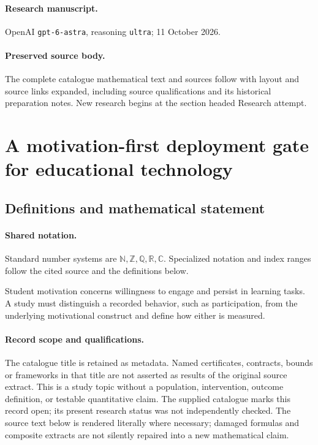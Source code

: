 \documentclass[11pt]{article}
\begin{document}
\paragraph{Research manuscript.} OpenAI \texttt{gpt-6-astra}, reasoning \texttt{ultra}; 11 October 2026.
\paragraph{Preserved source body.} The complete catalogue mathematical text and sources follow with layout and source links expanded, including source qualifications and its historical preparation notes. New research begins at the section headed Research attempt.

\section{A motivation-first deployment gate for educational technology}\label{statement}

\subsection{Definitions and mathematical statement}

\paragraph{Shared notation.}Standard number systems are $\mathbb N,\mathbb Z,\mathbb Q,\mathbb R,\mathbb C$. Specialized notation and index ranges follow the cited source and the definitions below.


Student motivation concerns willingness to engage and persist in learning tasks. A study must distinguish a recorded behavior, such as participation, from the underlying motivational construct and define how either is measured.
\paragraph{Record scope and qualifications.}
The catalogue title is retained as metadata. Named certificates, contracts, bounds or frameworks in that title are not asserted as results of the original source extract.
This is a study topic without a population, intervention, outcome definition, or testable quantitative claim. The supplied catalogue marks this record open; its present research status was not independently checked.
The source text below is rendered literally where necessary; damaged formulas and composite extracts are not silently repaired into a new mathematical claim.
\end{document}
